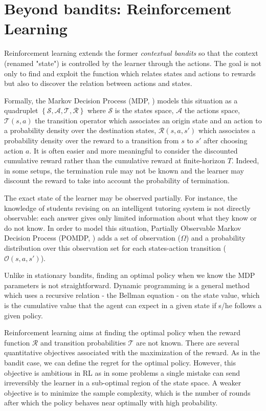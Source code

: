 {\section{Beyond bandits: Reinforcement Learning}
\label{sec:rl}
Reinforcement learning \citep{sutton1998book} extends the former \emph{contextual bandits} so that the context (renamed "state") is controlled by the learner through the actions. The goal is not only to find and exploit the function which relates states and actions to rewards but also to discover the relation between actions and states.

Formally, the Markov Decision Process (MDP, \cite{howard1960dynamic}) models this situation as a quadruplet $\left\{\mathcal{S}, \mathcal{A}, \mathcal{T},  \mathcal{R}\right\}$ where $\mathcal{S}$ is the states space, $\mathcal{A}$ the actions space, $\mathcal{T}(s, a)$ the transition operator which associates an origin state and an action to a probability density over the destination states, $\mathcal{R}(s, a ,s')$ which associates a probability density over the reward to a transition from $s$ to $s'$ after choosing action $a$. It is often easier and more meaningful to consider the discounted cumulative reward rather than the cumulative reward at finite-horizon $T$. Indeed, in some setups, the termination rule may not be known and the learner may discount the reward to take into account the probability of termination.

The exact state of the learner may be observed partially. For instance, the knowledge of students revising on an intelligent tutoring system is not directly observable: each answer gives only limited information about what they know or do not know. In order to model this situation, Partially Observable Markov Decision Process (POMDP, \cite{astrom1965optimal}) adds a set of observation ($\Omega$) and a probability distribution over this observation set for each states-action transition ($\mathcal{O}(s,a,s')$).

Unlike in stationary bandits, finding an optimal policy when we know the MDP parameters is not straightforward. Dynamic programming \citep{bellman1966dynamic} is a general method which uses a recursive relation -  the Bellman equation - on the state value, which is the cumulative value that the agent can expect in a given state if s/he follows a given policy.  

Reinforcement learning aims at finding the optimal policy when the reward function $\mathcal{R}$ and transition probabilities $\mathcal{T}$ are not known. There are several quantitative objectives associated with the maximization of the reward. As in the bandit case, we can define the regret for the optimal policy. However, this objective is ambitious in RL as in some problems a single mistake can send irreversibly the learner in a sub-optimal region of the state space. A weaker objective is to minimize the sample complexity, which is the number of rounds after which the policy behaves near optimally with high probability. 

}
